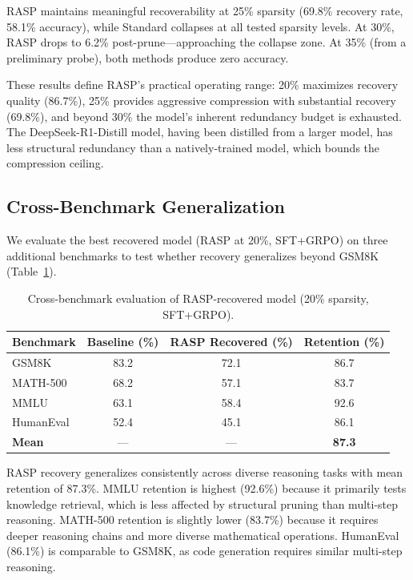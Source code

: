 \documentclass[11pt]{article}
\begin{document}
RASP maintains meaningful recoverability at 25\% sparsity (69.8\% recovery rate, 58.1\% accuracy), while Standard collapses at all tested sparsity levels.
At 30\%, RASP drops to 6.2\% post-prune---approaching the collapse zone.
At 35\% (from a preliminary probe), both methods produce zero accuracy.

These results define RASP's practical operating range: 20\% maximizes recovery quality (86.7\%), 25\% provides aggressive compression with substantial recovery (69.8\%), and beyond 30\% the model's inherent redundancy budget is exhausted.
The DeepSeek-R1-Distill model, having been distilled from a larger model, has less structural redundancy than a natively-trained model, which bounds the compression ceiling.


\subsection{Cross-Benchmark Generalization}
\label{sec:generalization}

We evaluate the best recovered model (RASP at 20\%, SFT+GRPO) on three additional benchmarks to test whether recovery generalizes beyond GSM8K (Table~\ref{tab:cross}).

\begin{table}[t]
\centering
\caption{Cross-benchmark evaluation of RASP-recovered model (20\% sparsity, SFT+GRPO).}
\label{tab:cross}
\begin{tabular}{lccc}
\toprule
\textbf{Benchmark} & \textbf{Baseline (\%)} & \textbf{RASP Recovered (\%)} & \textbf{Retention (\%)} \\
\midrule
GSM8K     & 83.2 & 72.1 & 86.7 \\
MATH-500  & 68.2 & 57.1 & 83.7 \\
MMLU      & 63.1 & 58.4 & 92.6 \\
HumanEval & 52.4 & 45.1 & 86.1 \\
\midrule
\textbf{Mean} & --- & --- & \textbf{87.3} \\
\bottomrule
\end{tabular}
\end{table}

RASP recovery generalizes consistently across diverse reasoning tasks with mean retention of 87.3\%.
MMLU retention is highest (92.6\%) because it primarily tests knowledge retrieval, which is less affected by structural pruning than multi-step reasoning.
MATH-500 retention is slightly lower (83.7\%) because it requires deeper reasoning chains and more diverse mathematical operations.
HumanEval (86.1\%) is comparable to GSM8K, as code generation requires similar multi-step reasoning.
\end{document}
